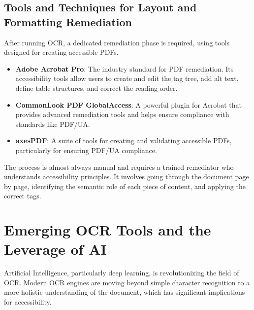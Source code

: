 \subsection{Tools and Techniques for Layout and Formatting Remediation}
\label{subsec:ocr-remediation-tools}
After running OCR, a dedicated remediation phase is required, using tools designed for creating accessible PDFs.
\begin{itemize}
	\item \textbf{Adobe Acrobat Pro}: The industry standard for PDF remediation. Its accessibility tools allow users to create and edit the tag tree, add alt text, define table structures, and correct the reading order.
	\item \textbf{CommonLook PDF GlobalAccess\supercite{AllyantCommonLook}}: A powerful plugin for Acrobat that provides advanced remediation tools and helps ensure compliance with standards like PDF/UA.
	\item \textbf{axesPDF}: A suite of tools for creating and validating accessible PDFs, particularly for ensuring PDF/UA compliance.
\end{itemize}
The process is almost always manual and requires a trained remediator who understands accessibility principles. It involves going through the document page by page, identifying the semantic role of each piece of content, and applying the correct tags.

\section{Emerging OCR Tools and the Leverage of AI}
\label{sec:ocr-ai}
Artificial Intelligence, particularly deep learning, is revolutionizing the field of OCR. Modern OCR engines are moving beyond simple character recognition to a more holistic understanding of the document, which has significant implications for accessibility.

